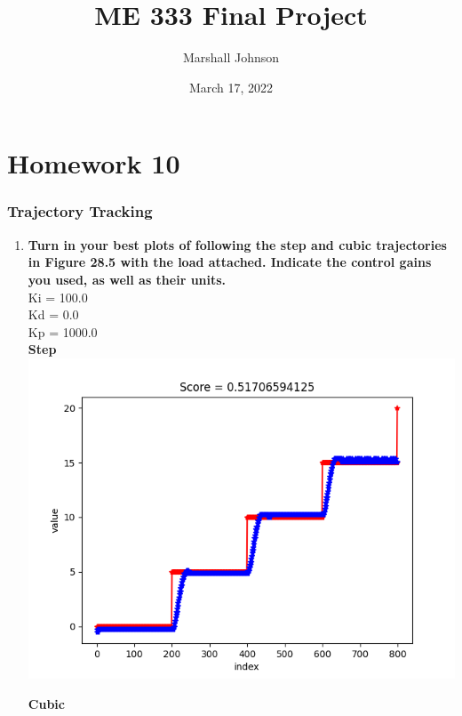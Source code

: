 \documentclass{article}
\title{ME 333 Final Project}
\author{Marshall Johnson}
\date{March 17, 2022}
\begin{document}
\maketitle

\section*{Homework 10}

\setcounter{section}{28}
\setcounter{subsection}{4}
\setcounter{subsubsection}{11}
\subsubsection{Trajectory Tracking}
\begin{enumerate}[label=\textbf{\arabic*})]
    \item \textbf{Turn in your best plots of following the step and cubic trajectories in Figure 28.5
    with the load attached. Indicate the control gains you used, as well as their units.} \\

        Ki = 100.0 \\
        Kd = 0.0 \\
        Kp = 1000.0 \\

        \textbf{Step} \\

        \includegraphics[width=\linewidth]{step.png}

        \pagebreak
        \textbf{Cubic} \\


\end{enumerate}
\end{document}
